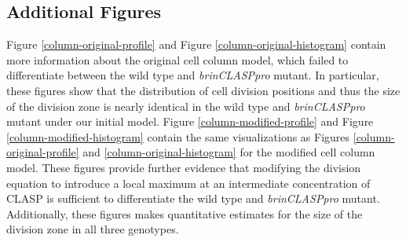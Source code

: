 \documentclass[referee,pdflatex,sn-mathphys-num]{sn-jnl}
\begin{document}
\begin{appendices}
\section{Additional Figures}\label{secA3}

Figure \ref{column-original-profile} and Figure \ref{column-original-histogram} contain more information about the original cell column model, which failed to differentiate between the wild type and \emph{brinCLASPpro} mutant.
In particular, these figures show that the distribution of cell division positions and thus the size of the division zone is nearly identical in the wild type and \emph{brinCLASPpro} mutant under our initial model. 
Figure \ref{column-modified-profile} and Figure \ref{column-modified-histogram} contain the same visualizations as Figures \ref{column-original-profile} and \ref{column-original-histogram} for the modified cell column model.
These figures provide further evidence that modifying the division equation to introduce a local maximum at an intermediate concentration of CLASP is sufficient to differentiate the wild type and \emph{brinCLASPpro} mutant.
Additionally, these figures makes quantitative estimates for the size of the division zone in all three genotypes.


\end{appendices}
\end{document}
